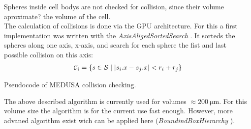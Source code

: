 % 
Spheres inside cell bodys are not checked for collision, since their volume aproximate? the volume of the cell.\\
% 
The calculation of collisions is done via the GPU architecture. For this a first implementation was written with the \textit{AxisAligedSortedSearch} \cite{Karras2012}. It sorteds the spheres along one axis, \eg x-axis, and search for each sphere the fist and last possible collision on this axis:
\begin{align}
\begin{split}
\mathcal{C}_i = \{ s \in \mathcal{S} \mid \lvert s_i.x - s_j.x\rvert < r_i+r_j \}
\end{split}
\end{align}
% 
\begin{lstfloat}[!tb]
	
	\caption{Pseudocode of \acs{MEDUSA} collision checking.}
	\label{alg:medusa_collision}
\end{lstfloat}
% 
The above described algorithm is currently used for volumes $\approx \SI{200}{\micro\meter}$. For this volume size the algorithm is for the current use fast enough. However, more advaned algorithm exist wich can be applied here (\eg \textit{BoundindBoxHierarchy} \cite{Karras2012}).
% 
